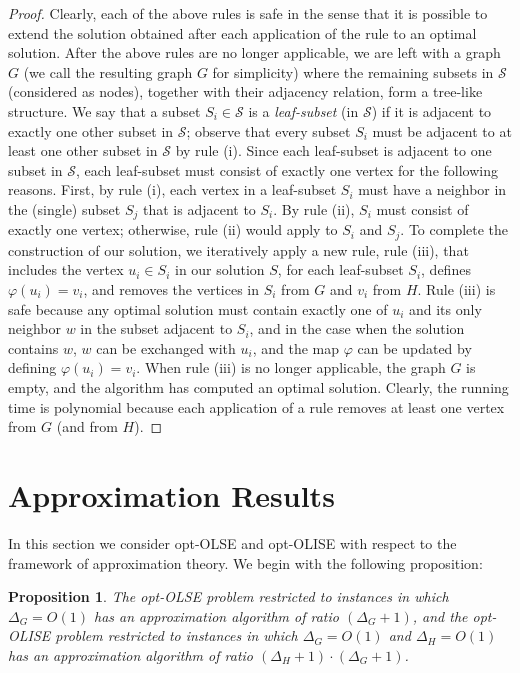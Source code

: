 \documentclass[11pt]{article}
\newtheorem{proposition}[theorem]{Proposition}
\let\phi=\varphi
\begin{document}
\begin{proof}
Clearly, each of the above rules is safe in the sense that it is possible to extend the solution obtained after each application of the rule to an optimal solution. After the above rules are no longer applicable, we are left with a graph $G$ (we call the resulting graph $G$ for simplicity) where the remaining subsets in $\mathcal{S}$ (considered as nodes), together with their adjacency relation, form a tree-like structure.  We say that a subset $S_i \in \mathcal{S}$ is a {\em leaf-subset} (in $\mathcal{S}$) if it is adjacent to exactly one other subset in $\mathcal{S}$; observe that every subset $S_i$ must be adjacent to at least one other subset in $\mathcal{S}$ by rule (i). Since each leaf-subset is adjacent to one subset in $\mathcal{S}$, each leaf-subset must consist of exactly one vertex for the following reasons. First, by rule (i), each vertex in a leaf-subset $S_i$ must have a neighbor in the (single) subset $S_j$ that is adjacent to $S_i$. By rule (ii), $S_i$ must consist of exactly one vertex; otherwise, rule (ii) would apply to $S_i$ and $S_j$. To complete the construction of our solution, we iteratively apply a new rule, rule (iii), that includes the vertex $u_i \in S_i$ in our solution $S$, for each leaf-subset $S_i$, defines $\phi(u_i) = v_i$, and removes the vertices in $S_i$ from $G$ and $v_i$ from $H$. Rule (iii) is safe because any optimal solution must contain exactly one of $u_i$ and its only neighbor $w$ in the subset adjacent to $S_i$, and in the case when the solution contains $w$, $w$ can be exchanged with $u_i$, and the map $\phi$ can be updated by defining $\phi(u_i)=v_i$. When rule (iii) is no longer applicable, the graph $G$ is empty, and the algorithm has computed an optimal solution.  Clearly, the running time is polynomial because each application of a rule removes at least one vertex from $G$ (and from $H$). \end{proof}

\section{Approximation Results}\label{subsec:approximation}
In this section we consider opt-OLSE and opt-OLISE with respect to the framework of approximation theory. We begin with the following proposition:

\begin{proposition}\label{prop:apx}
The opt-OLSE problem restricted to instances in which $\Delta_G=O(1)$ has an approximation algorithm of ratio $(\Delta_G+1)$, and the opt-OLISE problem restricted to instances in which $\Delta_G=O(1)$ and $\Delta_H=O(1)$ has an approximation algorithm of ratio $(\Delta_H+1) \cdot (\Delta_G+1)$.
\end{proposition}
\end{document}
